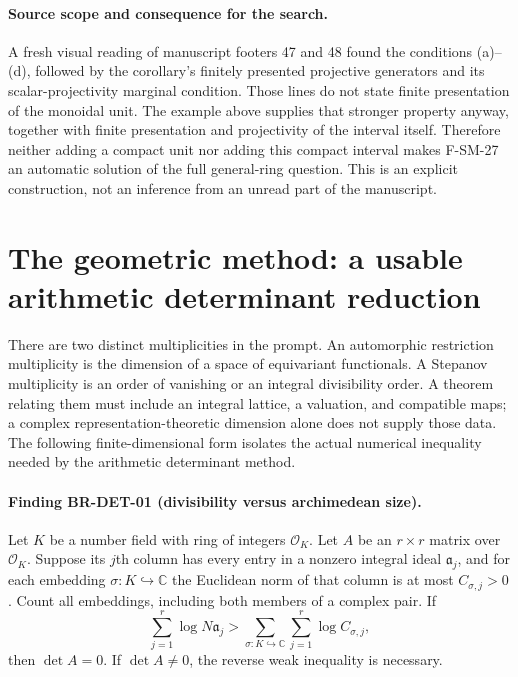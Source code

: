 \documentclass[11pt,a4paper]{article}
\theoremstyle{definition}\newtheorem{definition}[theorem]{Definition}
\theoremstyle{remark}\newtheorem{remark}[theorem]{Remark}
\begin{document}
\paragraph{Source scope and consequence for the search.}
A fresh visual reading of manuscript footers 47 and 48 found the
conditions (a)--(d), followed by the corollary's finitely presented
projective generators and its scalar-projectivity marginal condition.
Those lines do not state finite presentation of the monoidal unit.
The example above supplies that stronger property anyway, together
with finite presentation and projectivity of the interval itself.
Therefore neither adding a compact unit nor adding this compact
interval makes F-SM-27 an automatic solution of the full general-ring
question.  This is an explicit construction, not an inference from
an unread part of the manuscript.



\section{The geometric method: a usable arithmetic determinant reduction}
\label{sec:root-method}

There are two distinct multiplicities in the prompt.  An automorphic
restriction multiplicity is the dimension of a space of equivariant
functionals.  A Stepanov multiplicity is an order of vanishing or an
integral divisibility order.  A theorem relating them must include an
integral lattice, a valuation, and compatible maps; a complex
representation-theoretic dimension alone does not supply those data.
The following finite-dimensional form isolates the actual numerical
inequality needed by the arithmetic determinant method.

\paragraph{Finding BR-DET-01 (divisibility versus archimedean size).}
Let $K$ be a number field with ring of integers $\mathcal O_K$.
Let $A$ be an $r\times r$ matrix over $\mathcal O_K$.  Suppose its
$j$th column has every entry in a nonzero integral ideal $\mathfrak a_j$,
and for each embedding $\sigma:K\hookrightarrow\mathbb C$ the
Euclidean norm of that column is at most $C_{\sigma,j}>0$.
Count all embeddings, including both members of a complex pair.
If
\[
 \sum_{j=1}^r\log N\mathfrak a_j
   >\sum_{\sigma:K\hookrightarrow\mathbb C}
                     \sum_{j=1}^r\log C_{\sigma,j},             \tag{D.1}
\]
then $\det A=0$.  If $\det A\ne0$, the reverse weak inequality
is necessary.
\end{document}
